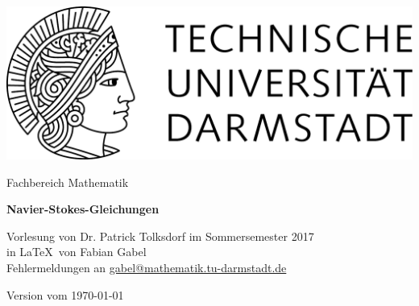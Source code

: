 \documentclass[11pt,a4paper,leqno]{report}
\begin{document}
\hypersetup{pageanchor=false}
\begin{titlepage}
  \begin{center}
    \vspace{1cm}
    \includegraphics[width=0.5\linewidth]{TU_Darmstadt_Logo.pdf}
    \vspace{1cm}
    
    \large{Fachbereich Mathematik}
    \vspace{3.5cm}
    
    \Huge{\textbf{Navier-Stokes-Gleichungen}}
    
    \vspace*{1cm}    
    \large{Vorlesung von Dr. Patrick Tolksdorf im Sommersemester 2017\\}
    \vspace*{1.0cm}
    \small{in \LaTeX\ von Fabian Gabel\\}
    \small{Fehlermeldungen an \url{gabel@mathematik.tu-darmstadt.de}}

    \vspace*{\fill}
    \small{Version vom \today}
  \end{center}
\end{titlepage}

\hypersetup{pageanchor=true}
\tableofcontents




%
%
\end{document}
